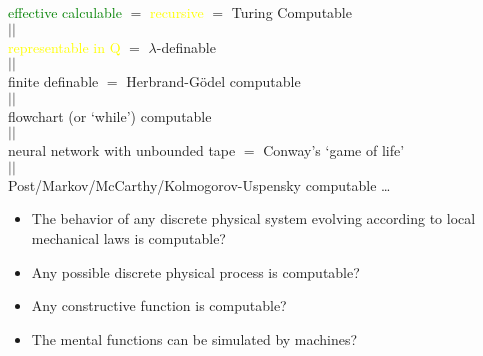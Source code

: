 \documentclass[UTF8,11pt,colorlinks,compress,openany]{beamer}%
\begin{document}
\begin{frame}\frametitle{}
	\begin{thesis}
		\begin{center}
			\textcolor{green}{effective calculable} $=$ \textcolor{yellow}{recursive} $=$ Turing Computable\\
			$\scriptstyle ||$\\
			\textcolor{yellow}{representable in $\mathrm{Q}$} $=$ $\lambda$-definable\\
			$\scriptstyle ||$\\
			finite definable $=$ Herbrand-G\"odel computable\\
			$\scriptstyle ||$\\
			flowchart (or `while') computable\\
			$\scriptstyle ||$\\
			neural network with unbounded tape $=$ Conway's `game of life'\\
			$\scriptstyle ||$\\
			Post/Markov/McCarthy/Kolmogorov-Uspensky computable \ldots
		\end{center}
	\end{thesis}
	\begin{itemize}
		\item The behavior of any discrete physical system evolving according to local mechanical laws is computable?
		\item Any possible discrete physical process is computable?
		\item Any constructive function is computable?
		\item The mental functions can be simulated by machines?
	\end{itemize}
\end{frame}
\end{document}
